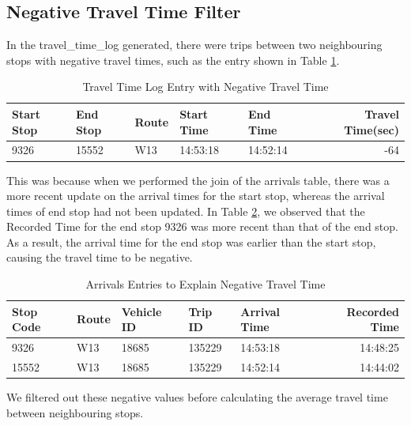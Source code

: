 \subsection{Negative Travel Time Filter}
\par In the travel\_time\_log generated, there were trips between two neighbouring stops with negative travel times, such as the entry shown in Table \ref{table:travel_time_log_negative}.

\begin{table}
\centering
\begin{tabular}{@{}lllllr@{}} \toprule
Start Stop & End Stop & Route & Start Time & End Time & Travel Time(sec) \\ \midrule
9326 & 15552 & W13 & 14:53:18 & 14:52:14 & -64 \\ \bottomrule
\end{tabular}
\caption{Travel Time Log Entry with Negative Travel Time}
\label{table:travel_time_log_negative}
\end{table}

\par This was because when we performed the join of the arrivals table, there was a more recent update on the arrival times for the start stop, whereas the arrival times of end stop had not been updated. In Table \ref{table:negative_travel_time_explained}, we observed that the Recorded Time for the end stop 9326 was more recent than that of the end stop. As a result, the arrival time for the end stop was earlier than the start stop, causing the travel time to be negative.

\begin{table}
\centering
\begin{tabular}{@{}lllllr@{}} \toprule
Stop Code & Route & Vehicle ID & Trip ID & Arrival Time & Recorded Time\\ \midrule
9326 & W13 & 18685 & 135229 &  14:53:18 & 14:48:25 \\ [0.4cm]
15552 & W13 & 18685 & 135229 & 14:52:14 & 14:44:02 \\ \bottomrule
\end{tabular}
\caption{Arrivals Entries to Explain Negative Travel Time}
\label{table:negative_travel_time_explained}
\end{table}

\par We filtered out these negative values before calculating the average travel time between neighbouring stops.
